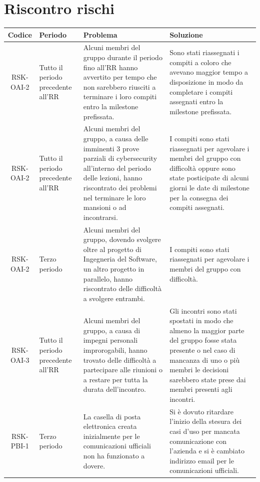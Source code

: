 \appendix
{}

	\section{Riscontro rischi}

		\begin{center}
			\begin{longtable}{|c|p{3cm}|p{4cm}|p{4cm}|}
			\hline
			\rowcolor{lighter-grayer}
			\textbf{Codice} & \textbf{Periodo} & \textbf{Problema} & \textbf{Soluzione} \\
			\hline
			\endfirsthead

			\hline
			RSK-OAI-2 & Tutto il periodo precedente all'RR & Alcuni membri del gruppo durante il periodo fino all'RR hanno avvertito per tempo che non sarebbero riusciti a terminare i loro compiti entro la milestone prefissata. & Sono stati riassegnati i compiti a coloro che avevano maggior tempo a disposizione in modo da completare i compiti assegnati entro la milestone prefissata. \\
			\hline
			\hline
			RSK-OAI-2 & Tutto il periodo precedente all'RR & Alcuni membri del gruppo, a causa delle imminenti 3 prove parziali di cybersecurity all'interno del periodo delle lezioni, hanno riscontrato dei problemi nel terminare le loro mansioni o ad incontrarsi. & I compiti sono stati riassegnati per agevolare i membri del gruppo con difficoltà oppure sono state posticipate di alcuni giorni le date di milestone per la consegna dei compiti assegnati.  \\
			\hline
			\hline
			RSK-OAI-2 & Terzo periodo & Alcuni membri del gruppo, dovendo svolgere oltre al progetto di Ingegneria del Software, un altro progetto in parallelo, hanno riscontrato delle difficoltà a svolgere entrambi. & I compiti sono stati riassegnati per agevolare i membri del gruppo con difficoltà.  \\
			\hline
			\hline
			RSK-OAI-3 & Tutto il periodo precedente all'RR & Alcuni membri del gruppo, a causa di impegni personali improrogabili, hanno trovato delle difficoltà a partecipare alle riunioni o a restare per tutta la durata dell'incontro. & Gli incontri sono stati spostati in modo che almeno la maggior parte del gruppo fosse stata presente o nel caso di mancanza di uno o più membri le decisioni sarebbero state prese dai membri presenti agli incontri. \\
			\hline
			\hline
			RSK-PBI-1 & Terzo periodo & La casella di posta elettronica creata inizialmente per le comunicazioni ufficiali non ha funzionato a dovere. & Si è dovuto ritardare l'inizio della stesura dei casi d'uso per mancata comunicazione con l'azienda e si è cambiato indirizzo email per le comunicazioni ufficiali. \\

\end{longtable}
\end{center}

